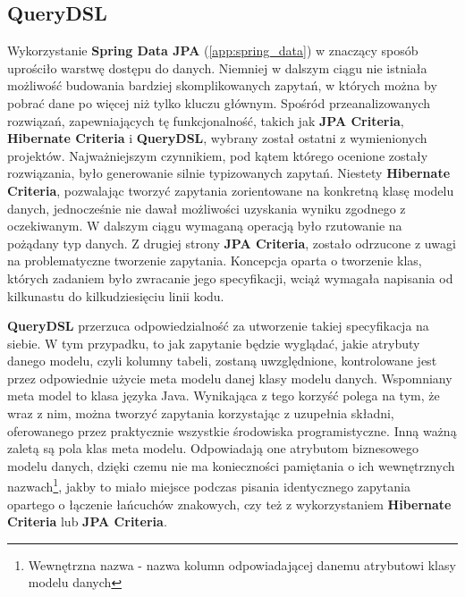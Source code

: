 \subsection{QueryDSL}
\label{tech:queryDSL}
	Wykorzystanie \textbf{Spring Data JPA} (\ref{app:spring_data}) w znaczący sposób uprościło warstwę dostępu do danych. Niemniej w dalszym ciągu nie istniała możliwość budowania bardziej skomplikowanych zapytań, w których można by pobrać dane po więcej niż tylko kluczu głównym. Spośród przeanalizowanych rozwiązań, zapewniających tę funkcjonalność, takich jak \textbf{JPA Criteria}, \textbf{Hibernate Criteria} i \textbf{QueryDSL}, wybrany został ostatni z wymienionych projektów. Najważniejszym czynnikiem, pod kątem którego ocenione zostały rozwiązania, było generowanie silnie typizowanych zapytań. Niestety \textbf{Hibernate Criteria}, pozwalając tworzyć zapytania zorientowane na konkretną klasę modelu danych, jednocześnie nie dawał możliwości uzyskania wyniku zgodnego z oczekiwanym. W dalszym ciągu wymaganą operacją było rzutowanie na pożądany typ danych. Z drugiej strony \textbf{JPA Criteria}, zostało odrzucone z uwagi na problematyczne tworzenie zapytania. Koncepcja oparta o tworzenie klas, których zadaniem było zwracanie jego specyfikacji, wciąż wymagała napisania od kilkunastu do kilkudziesięciu linii kodu. 
	\textbf{QueryDSL} przerzuca odpowiedzialność za utworzenie takiej specyfikacja na siebie. W tym przypadku, to jak zapytanie będzie wyglądać, jakie atrybuty danego modelu, czyli kolumny tabeli, zostaną uwzględnione, kontrolowane jest przez odpowiednie użycie meta modelu danej klasy modelu danych. Wspomniany meta model to klasa języka Java. Wynikająca z tego korzyść polega na tym, że wraz z nim, można tworzyć zapytania korzystając z uzupełnia składni, oferowanego przez praktycznie wszystkie środowiska programistyczne. Inną ważną zaletą są pola klas meta modelu. Odpowiadają one atrybutom biznesowego modelu danych, dzięki czemu nie ma konieczności pamiętania o ich wewnętrznych nazwach\footnote{Wewnętrzna nazwa - nazwa kolumn odpowiadającej danemu atrybutowi klasy modelu danych}, jakby to miało miejsce podczas pisania identycznego zapytania opartego o łączenie łańcuchów znakowych, czy też z wykorzystaniem \textbf{Hibernate Criteria} lub \textbf{JPA Criteria}. 
